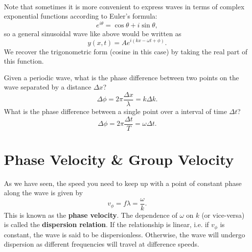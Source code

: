 \documentclass[../newtonian_mechanics.tex]{subfiles}
\begin{document}
        \paragraph{}
        Note that sometimes it is more convenient to express waves in terms of complex exponential functions according to Euler's formula:
        \begin{equation}
            e^{i\theta}=\cos\theta+i\sin\theta,
        \end{equation}
        so a general sinusoidal wave like above would be written as
        \begin{equation}
            y(x,t)=Ae^{i(kx-\omega t+\phi)}.
        \end{equation}
        We recover the trigonometric form (cosine in this case) by taking the real part of this function.
        \begin{example}
            Given a periodic wave, what is the phase difference between two points on the wave separated by a distance $\Delta x$?
            \begin{equation}
                \Delta\phi=2\pi\frac{\Delta x}{\lambda}=k\Delta k.
            \end{equation}
            What is the phase difference between a single point over a interval of time $\Delta t$?
            \begin{equation}
                \Delta\phi=2\pi\frac{\Delta t}{T}=\omega\Delta t.
            \end{equation}
        \end{example}

    \section{Phase Velocity \& Group Velocity}
        \paragraph{}
        As we have seen, the speed you need to keep up with a point of constant phase along the wave is given by
        \begin{equation}
            v_\phi=f\lambda=\frac{\omega}{k}.
        \end{equation}
        This is known as the \textbf{phase velocity}.
        The dependence of $\omega$ on $k$ (or vice-versa) is called the \textbf{dispersion relation}.
        If the relationship is linear, i.e. if $v_\phi$ is constant, the wave is said to be dispersionless.
        Otherwise, the wave will undergo dispersion as different frequencies will travel at difference speeds.
\end{document}
